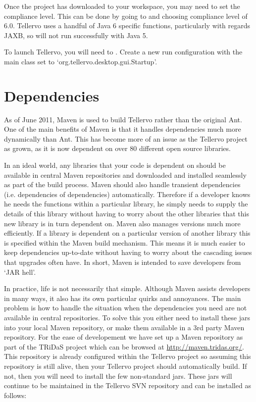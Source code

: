 Once the project has downloaded to your workspace, you may need to set the compliance level.  This can be done by going to  and choosing compliance level of 6.0.  Tellervo uses a handful of Java 6 specific functions, particularly with regards JAXB, so will not run successfully with Java 5.  

To launch Tellervo, you will need to .  Create a new run configuration with the main class set to `org.tellervo.desktop.gui.Startup'.     


\section{Dependencies}
\label{txt:DependenciesDesktopClient}
As of June 2011, Maven is used to build Tellervo rather than the original Ant.  One of the main benefits of Maven is that it handles dependencies much more dynamically than Ant.  This has become more of an issue as the Tellervo project as grown, as it is now dependent on over 80 different open source libraries.  

In an ideal world, any libraries that your code is dependent on should be available in central Maven repositories and downloaded and installed seamlessly as part of the build process.  Maven should also handle transient dependencies (i.e. dependencies of dependencies) automatically.  Therefore if a developer knows he needs the functions within a particular library, he simply needs to supply the details of this library without having to worry about the other libraries that this new library is in turn dependent on.  Maven also manages versions much more efficiently.  If a library is dependent on a particular version of another library this is specified within the Maven build mechanism.  This means it is much easier to keep dependencies up-to-date without having to worry about the cascading issues that upgrades often have.  In short, Maven is intended to save developers from `JAR hell'.

In practice, life is not necessarily that simple.  Although Maven assists developers in many ways, it also has its own particular quirks and annoyances.  The main problem is how to handle the situation when the dependencies you need are not available in central repositories.  To solve this you either need to install these jars into your local Maven repository, or make them available in a 3rd party Maven repository.  For the ease of developement we have set up a Maven repository as part of the TRiDaS project which can be browsed at \url{http://maven.tridas.org/}.  This repository is already configured within the Tellervo project so assuming this repository is still alive, then your Tellervo project should automatically build.  If not, then you will need to install the few non-standard jars.  These jars will continue to be maintained in the Tellervo SVN repository and can be installed as follows:

